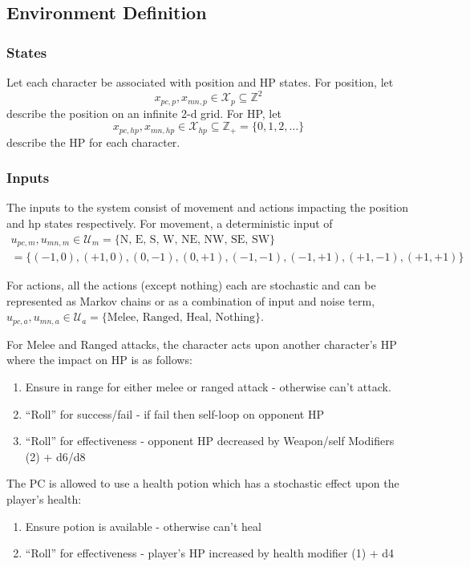 \documentclass[9pt, onecolumn]{report}
\newcommand{\Z}{\mathbb{Z}}
\begin{document}
\subsection{Environment Definition}
\subsubsection{States}
Let each character be associated with position and HP states.
For position, let \[
    x_{pc,p}, x_{mn,p} \in \mathcal{X}_{p} \subseteq \Z^{2}
\] describe the position on an infinite 2-d grid.
For HP, let \[
    x_{pc,hp}, x_{mn,hp} \in \mathcal{X}_{hp} \subseteq \Z_+ = \{0, 1, 2, \dots\}
\] describe the HP for each character.

\subsubsection{Inputs}
The inputs to the system consist of movement and actions impacting the position and hp states respectively.
For movement, a deterministic input of 
\begin{multline}
    u_{pc,m}, u_{mn,m} \in \mathcal{U}_{m} = \text{\{N, E, S, W, NE, NW, SE, SW\}}\\
    =\{(-1,0), (+1,0), (0,-1),(0,+1), (-1,-1), (-1,+1), (+1,-1),(+1,+1)\}
\end{multline}

For actions, all the actions (except nothing) each are stochastic and can be represented as Markov chains or as a combination of input and noise term, $u_{pc,a}, u_{mn,a} \in \mathcal{U}_{a} = \{\text{Melee, Ranged, Heal, Nothing}\}$.

For Melee and Ranged attacks, the character acts upon another character's HP where the impact on HP is as follows:
\begin{enumerate}
    \item Ensure in range for either melee or ranged attack - otherwise can't attack.
    \item ``Roll'' for success/fail - if fail then self-loop on opponent HP
    \item ``Roll'' for effectiveness - opponent HP decreased by Weapon/self Modifiers (2) + d6/d8
\end{enumerate}

The PC is allowed to use a health potion which has a stochastic effect upon the player's health:
\begin{enumerate}
    \item Ensure potion is available - otherwise can't heal
    \item ``Roll'' for effectiveness - player's HP increased by health modifier (1) + d4
\end{enumerate}
\end{document}

